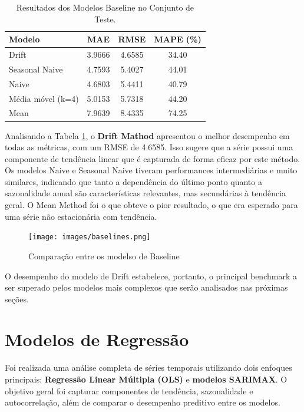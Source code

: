 \documentclass{article}
\begin{document}
\begin{table}[h]
    \centering
    \begin{tabular}{|l|c|c|c|}
        \hline
        \textbf{Modelo} & \textbf{MAE} & \textbf{RMSE} & \textbf{MAPE (\%)} \\
        \hline
        Drift & 3.9666 & 4.6585 & 34.40 \\
        Seasonal Naive & 4.7593 & 5.4027 & 44.01 \\
        Naive & 4.6803 & 5.4411 & 40.79 \\
        Média móvel (k=4) & 5.0153 & 5.7318 & 44.20 \\
        Mean & 7.9639 & 8.4335 & 74.25 \\
        \hline
    \end{tabular}
    \caption{Resultados dos Modelos Baseline no Conjunto de Teste.}
    \label{tab:baseline_results}
\end{table}

Analisando a Tabela \ref{tab:baseline_results}, o \textbf{Drift Mathod} apresentou o melhor desempenho em todas as métricas, com um RMSE de 4.6585. Isso sugere que a série possui uma componente de tendência linear que é capturada de forma eficaz por este método. Os modelos Naive e Seasonal Naive tiveram performances intermediárias e muito similares, indicando que tanto a dependência do último ponto quanto a sazonalidade anual são características relevantes, mas secundárias à tendência geral. O Mean Method foi o que obteve o pior resultado, o que era esperado para uma série não estacionária com tendência.
\begin{figure}[H]
    \centering
    \texttt{[image: images/baselines.png]}
    \caption{Comparação entre os modelso de Baseline}
    \label{fig:sarimax_residuals}
\end{figure}
O desempenho do modelo de Drift estabelece, portanto, o principal benchmark a ser superado pelos modelos mais complexos que serão analisados nas próximas seções.

\section*{Modelos de Regressão}

Foi realizada uma análise completa de séries temporais utilizando dois enfoques principais: \textbf{Regressão Linear Múltipla (OLS)} e \textbf{modelos SARIMAX}. O objetivo geral foi capturar componentes de tendência, sazonalidade e autocorrelação, além de comparar o desempenho preditivo entre os modelos.
\end{document}
